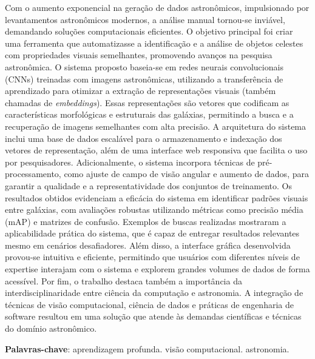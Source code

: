 \documentclass[
	12pt,				%
	openright,			%
	twoside,			%
	a4paper,			%
  sumario=tradicional,
	english,			%
	french,				%
	spanish,			%
	brazil				%
	]{abntex2}
\begin{document}
\setlength{\absparsep}{18pt} %
\begin{resumo}
  Com o aumento exponencial na geração de dados astronômicos, impulsionado por levantamentos astronômicos modernos, a análise manual tornou-se inviável, demandando soluções computacionais eficientes. O objetivo principal foi criar uma ferramenta que automatizasse a identificação e a análise de objetos celestes com propriedades visuais semelhantes, promovendo avanços na pesquisa astronômica. O sistema proposto baseia-se em redes neurais convolucionais (CNNs) treinadas com imagens astronômicas, utilizando a transferência de aprendizado para otimizar a extração de representações visuais (também chamadas de \emph{embeddings}). Essas representações são vetores que codificam as características morfológicas e estruturais das galáxias, permitindo a busca e a recuperação de imagens semelhantes com alta precisão. A arquitetura do sistema inclui uma base de dados escalável para o armazenamento e indexação dos vetores de representação, além de uma interface web responsiva que facilita o uso por pesquisadores. Adicionalmente, o sistema incorpora técnicas de pré-processamento, como ajuste de campo de visão angular e aumento de dados, para garantir a qualidade e a representatividade dos conjuntos de treinamento. Os resultados obtidos evidenciam a eficácia do sistema em identificar padrões visuais entre galáxias, com avaliações robustas utilizando métricas como precisão média (mAP) e matrizes de confusão. Exemplos de buscas realizadas mostraram a aplicabilidade prática do sistema, que é capaz de entregar resultados relevantes mesmo em cenários desafiadores. Além disso, a interface gráfica desenvolvida provou-se intuitiva e eficiente, permitindo que usuários com diferentes níveis de expertise interajam com o sistema e explorem grandes volumes de dados de forma acessível. Por fim, o trabalho destaca também a importância da interdisciplinaridade entre ciência da computação e astronomia. A integração de técnicas de visão computacional, ciência de dados e práticas de engenharia de software resultou em uma solução que atende às demandas científicas e técnicas do domínio astronômico.

  \textbf{Palavras-chave}: aprendizagem profunda. visão computacional. astronomia.
\end{resumo}
\end{document}
